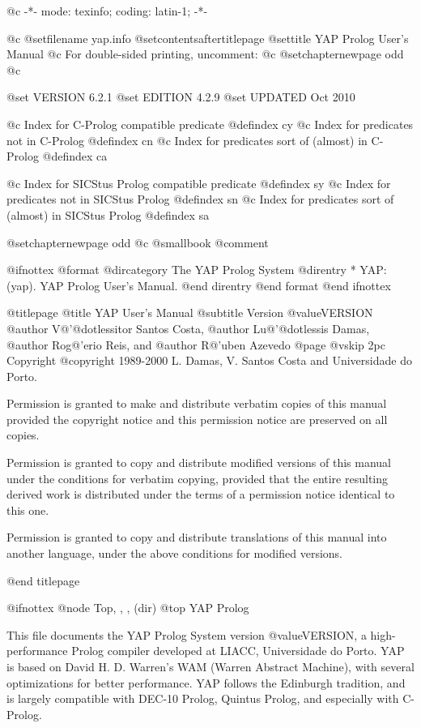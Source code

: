 @c -*- mode: texinfo; coding: latin-1; -*-

@c %
@setfilename yap.info
@setcontentsaftertitlepage
@settitle YAP Prolog User's Manual
@c For double-sided printing, uncomment:
@c @setchapternewpage odd
@c %

@set VERSION 6.2.1
@set EDITION 4.2.9
@set UPDATED Oct 2010

@c Index for C-Prolog compatible predicate
@defindex cy
@c Index for predicates not in C-Prolog
@defindex cn
@c Index for predicates sort of (almost) in C-Prolog
@defindex ca

@c Index for SICStus Prolog compatible predicate
@defindex sy
@c Index for predicates not in SICStus Prolog
@defindex sn
@c Index for predicates sort of (almost) in SICStus Prolog
@defindex sa


@setchapternewpage odd
@c @smallbook
@comment %

@ifnottex
@format
@dircategory The YAP Prolog System
@direntry
* YAP: (yap).           YAP Prolog User's Manual.
@end direntry
@end format
@end ifnottex

@titlepage
@title YAP User's Manual
@subtitle Version @value{VERSION}
@author V@'{@dotless{i}}tor Santos Costa,
@author Lu@'{@dotless{i}}s Damas,
@author Rog@'erio Reis, and
@author R@'uben Azevedo
@page
@vskip 2pc
Copyright @copyright{} 1989-2000 L. Damas, V. Santos Costa and Universidade
do Porto.

Permission is granted to make and distribute verbatim copies of
this manual provided the copyright notice and this permission notice
are preserved on all copies.

Permission is granted to copy and distribute modified versions of this
manual under the conditions for verbatim copying, provided that the entire
resulting derived work is distributed under the terms of a permission
notice identical to this one.

Permission is granted to copy and distribute translations of this manual
into another language, under the above conditions for modified versions.

@end titlepage

@ifnottex
@node Top, , , (dir)
@top YAP Prolog

This file documents the YAP Prolog System version @value{VERSION}, a
high-performance Prolog compiler developed at LIACC, Universidade do
Porto. YAP is based on David H. D. Warren's WAM (Warren Abstract
Machine), with several optimizations for better performance. YAP follows
the Edinburgh tradition, and is largely compatible with DEC-10 Prolog,
Quintus Prolog, and especially with C-Prolog.

